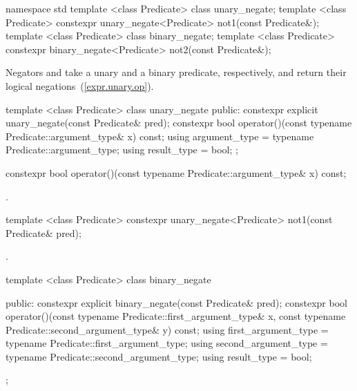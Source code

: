 \begin{codeblock}
namespace std {
  template <class Predicate> class unary_negate;
  template <class Predicate>
    constexpr unary_negate<Predicate> not1(const Predicate&);
  template <class Predicate> class binary_negate;
  template <class Predicate>
    constexpr binary_negate<Predicate> not2(const Predicate&);
}
\end{codeblock}

\pnum
Negators  and 
take a unary and a binary predicate, respectively,
and return their logical negations~(\ref{expr.unary.op}).

%
\begin{codeblock}
template <class Predicate>
class unary_negate {
public:
  constexpr explicit unary_negate(const Predicate& pred);
  constexpr bool operator()(const typename Predicate::argument_type& x) const;
  using argument_type = typename Predicate::argument_type;
  using result_type   = bool;
};
\end{codeblock}

%
\begin{itemdecl}
constexpr bool operator()(const typename Predicate::argument_type& x) const;
\end{itemdecl}

\begin{itemdescr}
\pnum \returns {}.
\end{itemdescr}

%
\begin{itemdecl}
template <class Predicate>
   constexpr unary_negate<Predicate> not1(const Predicate& pred);
\end{itemdecl}

\begin{itemdescr}
\pnum \returns {}.
\end{itemdescr}

%
\begin{codeblock}
template <class Predicate>
class binary_negate {
public:
  constexpr explicit binary_negate(const Predicate& pred);
  constexpr bool operator()(const typename Predicate::first_argument_type& x,
                            const typename Predicate::second_argument_type& y) const;
  using first_argument_type  = typename Predicate::first_argument_type;
  using second_argument_type = typename Predicate::second_argument_type;
  using result_type          = bool;

};
\end{codeblock}

